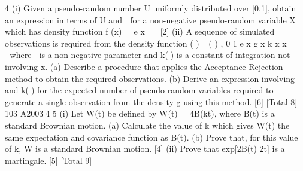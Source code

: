 
4 (i) Given a pseudo-random number U uniformly distributed over [0,1], obtain an
expression in terms of U and  for a non-negative pseudo-random variable X
which has density function
f (x) = e x 
 [2]
(ii) A sequence of simulated observations is required from the density function
( )= ( ) , 0
1
e x g x k x
x

 

where  is a non-negative parameter and k() is a constant of integration not
involving x.
(a) Describe a procedure that applies the Acceptance-Rejection method to
obtain the required observations.
(b) Derive an expression involving  and k() for the expected number of
pseudo-random variables required to generate a single observation
from the density g using this method.
[6]
[Total 8]
103 A20034
5 (i) Let W(t) be defined by W(t) = 	4B(kt), where B(t) is a standard Brownian
motion.
(a) Calculate the value of k which gives W(t) the same expectation and
covariance function as B(t).
(b) Prove that, for this value of k, W is a standard Brownian motion.
[4]
(ii) Prove that exp[2B(t)	2t] is a martingale. [5]
[Total 9]


